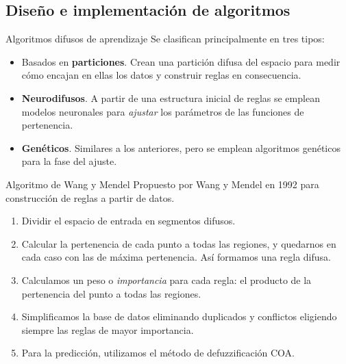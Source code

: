 \documentclass[10pt, spanish]{beamer}
\begin{document}
\subsection{Diseño e implementación de algoritmos}

\begin{frame}{Algoritmos difusos de aprendizaje}
  Se clasifican principalmente en tres tipos:

  \begin{itemize}
    \item Basados en \textbf{particiones}. Crean una partición difusa del espacio para medir cómo encajan en ellas los datos y construir reglas en consecuencia.
    \item \textbf{Neurodifusos}. A partir de una estructura inicial de reglas se emplean modelos neuronales para \textit{ajustar} los parámetros de las funciones de pertenencia.
    \item \textbf{Genéticos}. Similares a los anteriores, pero se emplean algoritmos genéticos para la fase del ajuste.
  \end{itemize}
\end{frame}

\begin{frame}{Algoritmo de Wang y Mendel}
  Propuesto por Wang y Mendel en 1992 para construcción de reglas a partir de datos.

  \begin{enumerate}[<+->]
    \item Dividir el espacio de entrada en segmentos difusos.
    \item Calcular la pertenencia de cada punto a todas las regiones, y quedarnos en cada caso con las de máxima pertenencia. Así formamos una regla difusa.
    \item Calculamos un peso o \textit{importancia} para cada regla: el producto de la pertenencia del punto a todas las regiones.
    \item Simplificamos la base de datos eliminando duplicados y conflictos eligiendo siempre las reglas de mayor importancia.
    \item Para la predicción, utilizamos el método de defuzzificación COA.
  \end{enumerate}
\end{frame}
\end{document}
